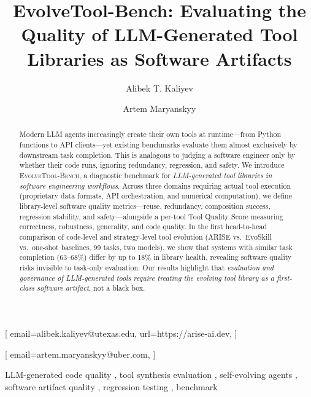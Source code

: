 \documentclass[]{ceurart}
\begin{document}


\title{EvolveTool-Bench: Evaluating the Quality of LLM-Generated Tool Libraries as Software Artifacts}

\author[1]{Alibek T. Kaliyev}[%
email=alibek.kaliyev@utexas.edu,
url=https://arise-ai.dev,
]
\cormark[1]
\author[2]{Artem Maryanskyy}[%
email=artem.maryanskyy@uber.com,
]
\address[1]{University of Texas at Austin, Austin, TX, USA}
\address[2]{Uber Technologies, USA}

\begin{abstract}
Modern LLM agents increasingly create their own tools at runtime---from Python functions to API clients---yet existing benchmarks evaluate them almost exclusively by downstream task completion. This is analogous to judging a software engineer only by whether their code runs, ignoring redundancy, regression, and safety. We introduce \textsc{EvolveTool-Bench}, a diagnostic benchmark for \emph{LLM-generated tool libraries in software engineering workflows}. Across three domains requiring actual tool execution (proprietary data formats, API orchestration, and numerical computation), we define library-level software quality metrics---reuse, redundancy, composition success, regression stability, and safety---alongside a per-tool Tool Quality Score measuring correctness, robustness, generality, and code quality. In the first head-to-head comparison of code-level and strategy-level tool evolution (ARISE vs.\ EvoSkill vs.\ one-shot baselines, 99 tasks, two models), we show that systems with similar task completion (63--68\%) differ by up to 18\% in library health, revealing software quality risks invisible to task-only evaluation. Our results highlight that \emph{evaluation and governance of LLM-generated tools require treating the evolving tool library as a first-class software artifact}, not a black box.
\end{abstract}

\begin{keywords}
  LLM-generated code quality \sep
  tool synthesis evaluation \sep
  self-evolving agents \sep
  software artifact quality \sep
  regression testing \sep
  benchmark
\end{keywords}
\end{document}
